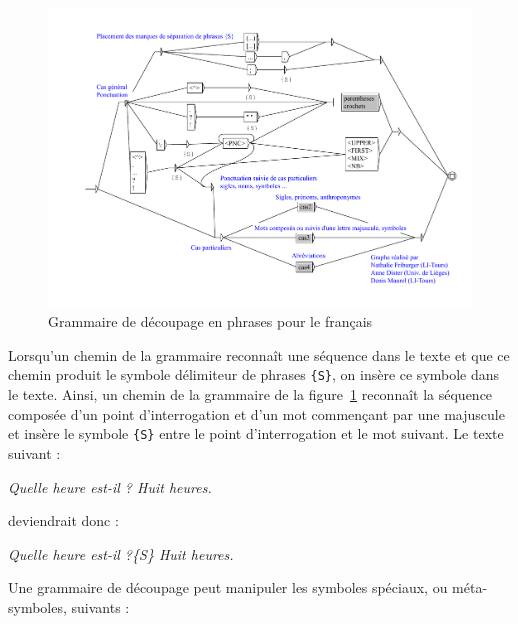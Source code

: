\begin{figure}[!ht]
\begin{center}
\includegraphics[width=15cm]{resources/img/fig2-10.pdf}
\caption{Grammaire de découpage en phrases pour le français
\label{fig-example-sentence-splitting}}
\end{center}
\end{figure}

\noindent  Lorsqu’un chemin de la grammaire reconnaît une séquence dans le texte et que ce chemin
produit le symbole délimiteur de phrases \verb+{S}+,
on insère ce symbole dans le texte. Ainsi,
un chemin de la grammaire de la figure~\ref{fig-example-sentence-splitting} reconnaît la séquence
composée d’un point d’interrogation et d’un mot commençant par une majuscule et insère le symbole 
\verb+{S}+ entre le point d’interrogation et le mot suivant. Le texte suivant :


\bigskip
\textit{Quelle heure est-il ? Huit heures.}

\bigskip
\noindent deviendrait donc :

\bigskip
\textit{Quelle heure est-il ?\{S\} Huit heures.}

\bigskip
\noindent Une grammaire de découpage peut manipuler les symboles spéciaux, ou méta-symboles, suivants :


